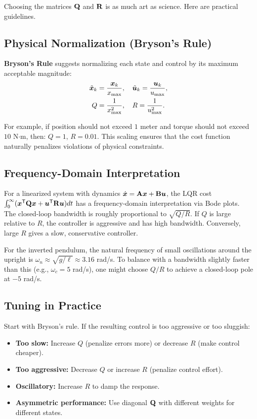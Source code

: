 Choosing the matrices $\mathbf{Q}$ and $\mathbf{R}$ is as much art as science. Here are practical guidelines.

\subsection{Physical Normalization (Bryson's Rule)}

\textbf{Bryson's Rule} suggests normalizing each state and control by its maximum acceptable magnitude:
\begin{align}
\tilde{\bm{x}}_k &= \frac{\bm{x}_k}{x_{\max}}, \quad \tilde{\bm{u}}_k = \frac{\bm{u}_k}{u_{\max}}, \label{eq:ch5:bryson-norm}\\
Q &= \frac{1}{x_{\max}^2}, \quad R = \frac{1}{u_{\max}^2}. \label{eq:ch5:bryson-weights}
\end{align}

For example, if position should not exceed $1$ meter and torque should not exceed $10$ N$\cdot$m, then:
$Q = 1$, $R = 0.01$. This scaling ensures that the cost function naturally penalizes violations of physical
constraints.

\subsection{Frequency-Domain Interpretation}

For a linearized system with dynamics $\dot{\bm{x}} = \mathbf{A}\bm{x} + \mathbf{B}\bm{u}$, the LQR cost $\int_0^\infty (\bm{x}^{\mathsf{T}}\mathbf{Q}\bm{x} + \bm{u}^{\mathsf{T}}\mathbf{R}\bm{u}) dt$
has a frequency-domain interpretation via Bode plots. The closed-loop bandwidth is roughly proportional to $\sqrt{Q/R}$.
If $Q$ is large relative to $R$, the controller is aggressive and has high bandwidth. Conversely, large $R$ gives
a slow, conservative controller.

For the inverted pendulum, the natural frequency of small oscillations around the upright is $\omega_n \approx \sqrt{g/\ell} \approx 3.16$ rad/s.
To balance with a bandwidth slightly faster than this (e.g., $\omega_c = 5$ rad/s), one might choose $Q/R$ to achieve
a closed-loop pole at $-5$ rad/s.

\subsection{Tuning in Practice}

Start with Bryson's rule. If the resulting control is too aggressive or too sluggish:
\begin{itemize}
\item \textbf{Too slow:} Increase $Q$ (penalize errors more) or decrease $R$ (make control cheaper).
\item \textbf{Too aggressive:} Decrease $Q$ or increase $R$ (penalize control effort).
\item \textbf{Oscillatory:} Increase $R$ to damp the response.
\item \textbf{Asymmetric performance:} Use diagonal $\mathbf{Q}$ with different weights for different states.
\end{itemize}

